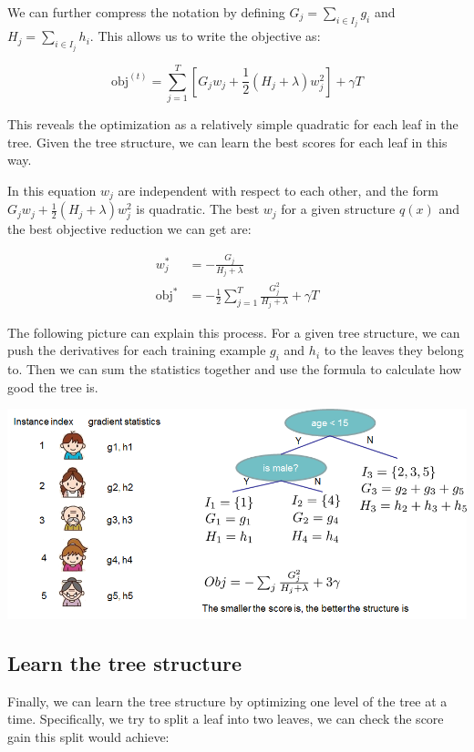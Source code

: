 \documentclass[12 pt, leqno]{article}
\begin{document}
We can further compress the notation by defining $G_j = \sum_{i \in I_j} g_i$ and $H_j = \sum_{i \in I_j} h_i$. This allows us to write the objective as:

$$ \text{obj}^{(t)} = \sum_{j = 1}^T [G_j w_j + \frac{1}{2} (H_j + \lambda) w_j^2 ]  + \gamma T $$

This reveals the optimization as a relatively simple quadratic for each leaf in the tree. Given the tree structure, we can learn the best scores for each leaf in this way.

In this equation $w_j$ are independent with respect to each other, and the form $G_j w_j + \frac{1}{2} (H_j + \lambda) w_j^2$ is quadratic. The best $w_j$ for a given structure $q(x)$ and the best objective reduction we can get are:

\begin{align*}
w_j^* &= - \frac{G_j}{H_j + \lambda} \\ 
\text{obj}^* &= -\frac{1}{2} \sum_{j = 1}^T \frac{G_j^2}{H_j + \lambda} + \gamma T
\end{align*}

The following picture can explain this process. For a given tree structure, we can push the derivatives for each training example $g_i$ and $h_i$ to the leaves they belong to. Then we can sum the statistics together and use the formula to calculate how good the tree is.

\includegraphics[scale=0.75]{struct_score}

\subsection{Learn the tree structure}

Finally, we can learn the tree structure by optimizing one level of the tree at a time. Specifically, we try to split a leaf into two leaves, we can check the score gain this split would achieve:
\end{document}
